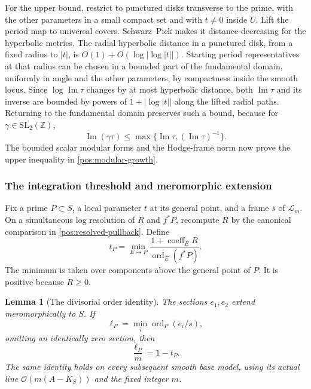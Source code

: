 \documentclass[11pt,letterpaper]{article}
\newtheorem{lemma}[theorem]{Lemma}
\theoremstyle{definition}
\theoremstyle{remark}
\begin{document}
For the upper bound, restrict to punctured disks transverse to the
prime, with the other parameters in a small compact set and with
\(t\ne0\) inside \(U\). Lift the period map to universal covers.
Schwarz--Pick makes it distance-decreasing for the hyperbolic metrics.
The radial hyperbolic distance in a punctured disk, from a fixed
radius to \(|t|\), is
\(O(1)+O(\log|\log|t||)\). Starting period representatives at that
radius can be chosen in a bounded part of the fundamental domain,
uniformly in angle and the other parameters, by compactness inside
the smooth locus. Since \(\log\operatorname{Im}\tau\) changes by
at most hyperbolic distance, both \(\operatorname{Im}\tau\) and its
inverse are bounded by powers of \(1+|\log|t||\) along the lifted
radial paths. Returning to the fundamental domain preserves such a
bound, because for \(\gamma\in\mathrm{SL}_2(\mathbb{Z})\),
\[
 \operatorname{Im}(\gamma\tau)
 \leq\max\{\operatorname{Im}\tau,(\operatorname{Im}\tau)^{-1}\}.
\]
The bounded scalar modular forms and the Hodge-frame norm now prove
the upper inequality in \eqref{pos:modular-growth}.

\subsubsection{The integration threshold and meromorphic extension}

Fix a prime \(P\subset S\), a local parameter \(t\) at its general
point, and a frame \(s\) of \(\mathcal L_m\). On a simultaneous log
resolution of \(R\) and \(f^*P\), recompute \(R\) by the canonical
comparison in \eqref{pos:resolved-pullback}. Define
\begin{equation}\label{pos:threshold-definition}
 t_P=\min_{E\mapsto P}
 \frac{1+\operatorname{coeff}_E R}{\operatorname{ord}_E(f^*P)}.
\end{equation}
The minimum is taken over components above the general point of
\(P\). It is positive because \(R\geq0\).

\begin{lemma}[The divisorial order identity]\label{pos:order-identity}
The sections \(e_1,e_2\) extend meromorphically to \(S\). If
\[
 \ell_P=\min_i\operatorname{ord}_P(e_i/s),
\]
omitting an identically zero section, then
\begin{equation}\label{pos:modular-order}
 \frac{\ell_P}{m}=1-t_P.
\end{equation}
The same identity holds on every subsequent smooth base model, using
its actual line \(\mathcal{O}(m(A-K_S))\) and the fixed integer \(m\).
\end{lemma}
\end{document}
